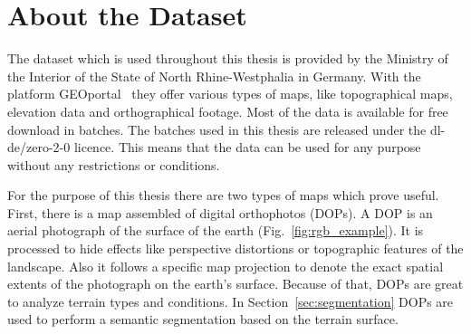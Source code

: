 \section{About the Dataset}
\label{sec:dataset_analysis}
The dataset which is used throughout this thesis is provided by the Ministry of the Interior of the State of North Rhine-Westphalia in Germany. With the platform GEOportal~\cite{geoportal20} they offer various types of maps, like topographical maps, elevation data and orthographical footage. Most of the data is available for free download in batches. The batches used in this thesis are released under the dl-de/zero-2-0 licence. This means that the data can be used for any purpose without any restrictions or conditions.

For the purpose of this thesis there are two types of maps which prove useful. First, there is a map assembled of digital orthophotos (DOPs). A DOP is an aerial photograph of the surface of the earth (Fig.~\ref{fig:rgb_example}). It is processed to hide effects like perspective distortions or topographic features of the landscape. Also it follows a specific map projection to denote the exact spatial extents of the photograph on the earth's surface. Because of that, DOPs are great to analyze terrain types and conditions. In Section~\ref{sec:segmentation} DOPs are used to perform a semantic segmentation based on the terrain surface.

